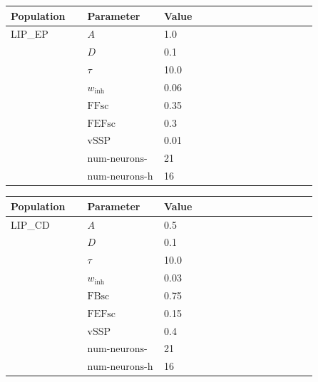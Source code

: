 \documentclass{article}
\begin{document}
\noindent
\begin{tabularx}{\linewidth}{|p{0.25\linewidth}|p{0.25\linewidth}|X|}\hline
\textbf{Population} & \textbf{Parameter} & \textbf{Value}   \\ \hline

    LIP\_EP             & $A$        & 1.0  \\ \hline

                 & $D$        & 0.1  \\ \hline

                 & $\tau$        & 10.0  \\ \hline

                 & $w_{\text{inh}}$        & 0.06  \\ \hline

                 & ${\text{FFsc}}$        & 0.35  \\ \hline

                 & ${\text{FEFsc}}$        & 0.3  \\ \hline

                 & ${\text{vSSP}}$        & 0.01  \\ \hline

                 & ${\text{num-neurons-w}}$        & 21  \\ \hline

                 & ${\text{num-neurons-h}}$        & 16  \\ \hline

\end{tabularx}

\vspace{2ex}

\noindent
\begin{tabularx}{\linewidth}{|p{0.25\linewidth}|p{0.25\linewidth}|X|}\hline
\textbf{Population} & \textbf{Parameter} & \textbf{Value}   \\ \hline

    LIP\_CD             & $A$        & 0.5  \\ \hline

                 & $D$        & 0.1  \\ \hline

                 & $\tau$        & 10.0  \\ \hline

                 & $w_{\text{inh}}$        & 0.03  \\ \hline

                 & ${\text{FBsc}}$        & 0.75  \\ \hline

                 & ${\text{FEFsc}}$        & 0.15  \\ \hline

                 & ${\text{vSSP}}$        & 0.4  \\ \hline

                 & ${\text{num-neurons-w}}$        & 21  \\ \hline

                 & ${\text{num-neurons-h}}$        & 16  \\ \hline

\end{tabularx}
\end{document}

